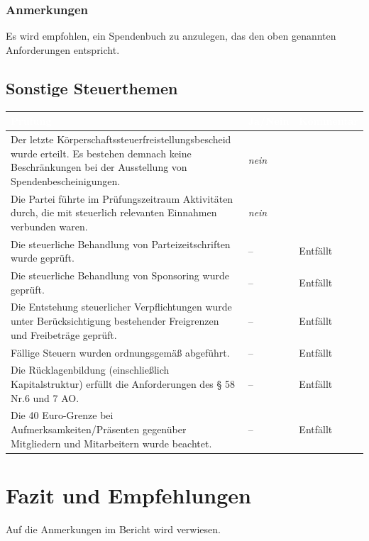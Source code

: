 \documentclass[%
	titlepage,oneside,12pt,headlines=1.5,numbers=noenddot, chapterprefix=false,parskip=full-,DIV=14,pagesize]{scrreprt}
\begin{document}
\subsection{Anmerkungen}
Es wird empfohlen, ein Spendenbuch zu anzulegen, das den oben genannten Anforderungen entspricht.

\pagebreak
\section{Sonstige Steuerthemen}
\begin{longtable}[ht]{|p{} p{} p{}|}
\hline\rowcolor{pirateorange} 
	\footnotesize\textcolor{white}{\textbf{Prüfung}} & \footnotesize\textcolor{white}{\textbf{Ja/Nein}} & \footnotesize\textcolor{white}{\textbf{Kommentar}}\\\endhead
        \scriptsize Der letzte Körperschaftssteuerfreistellungsbescheid wurde erteilt. Es bestehen demnach keine Beschränkungen bei der Ausstellung von Spendenbescheinigungen. & \scriptsize \textit{nein}  & \scriptsize \\ 
        \scriptsize Die Partei führte im Prüfungszeitraum Aktivitäten durch, die mit steuerlich relevanten Einnahmen verbunden waren. & \scriptsize \textit{nein}	& \scriptsize \\
        \scriptsize Die steuerliche Behandlung von Parteizeitschriften wurde geprüft. & \scriptsize -- & \scriptsize Entfällt \\
       	\scriptsize Die steuerliche Behandlung von Sponsoring wurde geprüft. & \scriptsize -- & \scriptsize Entfällt \\
       	\scriptsize Die Entstehung steuerlicher Verpflichtungen wurde unter Berücksichtigung bestehender Freigrenzen und Freibeträge geprüft. & \scriptsize -- & \scriptsize Entfällt \\
       	\scriptsize Fällige Steuern wurden ordnungsgemäß abgeführt. & \scriptsize -- & \scriptsize Entfällt \\
        \scriptsize Die Rücklagenbildung (einschließlich Kapitalstruktur) erfüllt die Anforderungen des § 58 Nr.6 und 7 AO. & \scriptsize -- & \scriptsize Entfällt \\
        \scriptsize Die 40 Euro-Grenze bei Aufmerksamkeiten/Präsenten gegenüber Mitgliedern und Mitarbeitern wurde beachtet. & \scriptsize -- & \scriptsize Entfällt \\
\hline
\end{longtable}

\chapter{Fazit und Empfehlungen}
Auf die Anmerkungen im Bericht wird verwiesen. 
\end{document}
